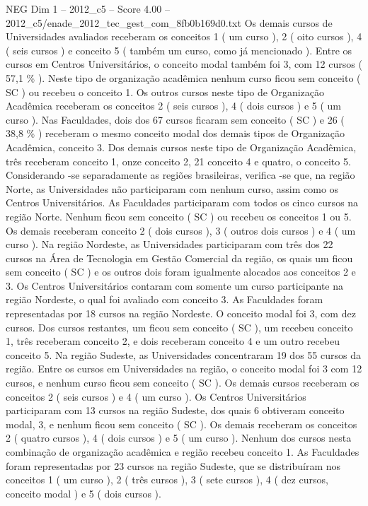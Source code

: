 \begin{textsample}{NEG Dim 1 – 2012\_c5 – Score 4.00 – 2012\_c5/enade\_2012\_tec\_gest\_com\_8fb0b169d0.txt}
Os demais cursos de Universidades avaliados receberam os conceitos 1 ( um curso ), 2 ( oito cursos ), 4 ( seis cursos ) e conceito 5 ( também um curso, como já mencionado ).
Entre os cursos em Centros Universitários, o conceito modal também foi 3, com 12 cursos ( 57,1 \% ).
Neste tipo de organização acadêmica nenhum curso ficou sem conceito ( SC ) ou recebeu o conceito 1.
Os outros cursos neste tipo de Organização Acadêmica receberam os conceitos 2 ( seis cursos ), 4 ( dois cursos ) e 5 ( um curso ).
Nas Faculdades, dois dos 67 cursos ficaram sem conceito ( SC ) e 26 ( 38,8 \% ) receberam o mesmo conceito modal dos demais tipos de Organização Acadêmica, conceito 3.
Dos demais cursos neste tipo de Organização Acadêmica, três receberam conceito 1, onze conceito 2, 21 conceito 4 e quatro, o conceito 5.
Considerando -se separadamente as regiões brasileiras, verifica -se que, na região Norte, as Universidades não participaram com nenhum curso, assim como os Centros Universitários.
As Faculdades participaram com todos os cinco cursos na região Norte.
Nenhum ficou sem conceito ( SC ) ou recebeu os conceitos 1 ou 5.
Os demais receberam conceito 2 ( dois cursos ), 3 ( outros dois cursos ) e 4 ( um curso ).
Na região Nordeste, as Universidades participaram com três dos 22 cursos na Área de Tecnologia em Gestão Comercial da região, os quais um ficou sem conceito ( SC ) e os outros dois foram igualmente alocados aos conceitos 2 e 3.
Os Centros Universitários contaram com somente um curso participante na região Nordeste, o qual foi avaliado com conceito 3.
As Faculdades foram representadas por 18 cursos na região Nordeste.
O conceito modal foi 3, com dez cursos.
Dos cursos restantes, um ficou sem conceito ( SC ), um recebeu conceito 1, três receberam conceito 2, e dois receberam conceito 4 e um outro recebeu conceito 5.
Na região Sudeste, as Universidades concentraram 19 dos 55 cursos da região.
Entre os cursos em Universidades na região, o conceito modal foi 3 com 12 cursos, e nenhum curso ficou sem conceito ( SC ).
Os demais cursos receberam os conceitos 2 ( seis cursos ) e 4 ( um curso ).
Os Centros Universitários participaram com 13 cursos na região Sudeste, dos quais 6 obtiveram conceito modal, 3, e nenhum ficou sem conceito ( SC ).
Os demais receberam os conceitos 2 ( quatro cursos ), 4 ( dois cursos ) e 5 ( um curso ).
Nenhum dos cursos nesta combinação de organização acadêmica e região recebeu conceito 1.
As Faculdades foram representadas por 23 cursos na região Sudeste, que se distribuíram nos conceitos 1 ( um curso ), 2 ( três cursos ), 3 ( sete cursos ), 4 ( dez cursos, conceito modal ) e 5 ( dois cursos ).

\end{textsample}

